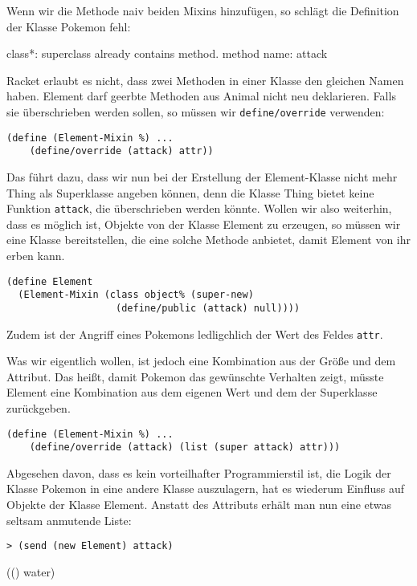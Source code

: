 Wenn wir die Methode naiv beiden Mixins hinzufügen, so schlägt die Definition der Klasse Pokemon fehl:

{\rerror class*: superclass already contains method. method name: attack}

Racket erlaubt es nicht, dass zwei Methoden in einer Klasse den gleichen Namen haben. Element darf geerbte Methoden aus Animal nicht neu deklarieren. Falls sie überschrieben werden sollen, so müssen wir \texttt{define/override} verwenden:

\begin{lstlisting}
(define (Element-Mixin %) ...
    (define/override (attack) attr))
\end{lstlisting}

Das führt dazu, dass wir nun bei der Erstellung der Element-Klasse nicht mehr Thing als Superklasse angeben können, denn die Klasse Thing bietet keine Funktion \texttt{attack}, die überschrieben werden könnte. Wollen wir also weiterhin, dass es möglich ist, Objekte von der Klasse Element zu erzeugen, so müssen wir eine Klasse bereitstellen, die eine solche Methode anbietet, damit Element von ihr erben kann.

\begin{lstlisting}
(define Element 
  (Element-Mixin (class object% (super-new)
                   (define/public (attack) null))))
\end{lstlisting}

Zudem ist der Angriff eines Pokemons ledligchlich der Wert des Feldes \texttt{attr}. 

Was wir eigentlich wollen, ist jedoch eine Kombination aus der Größe und dem Attribut. Das heißt, damit Pokemon das gewünschte Verhalten zeigt, müsste Element eine Kombination aus dem eigenen Wert und dem der Superklasse zurückgeben.

\begin{lstlisting}
(define (Element-Mixin %) ...
    (define/override (attack) (list (super attack) attr)))
\end{lstlisting}

Abgesehen davon, dass es kein vorteilhafter Programmierstil ist, die Logik der Klasse Pokemon in eine andere Klasse auszulagern, hat es wiederum Einfluss auf Objekte der Klasse Element. Anstatt des Attributs erhält man nun eine etwas seltsam anmutende Liste:

\begin{lstlisting}
> (send (new Element) attack)
\end{lstlisting}
{\rsymbol (() water)}

